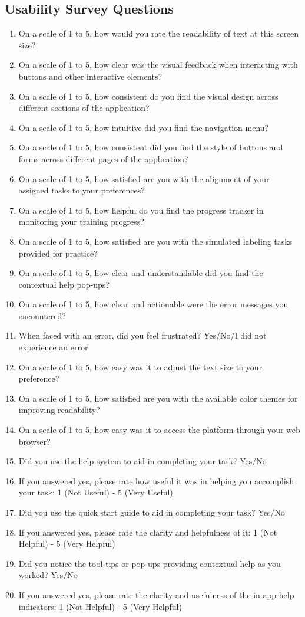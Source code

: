 \documentclass[12pt, titlepage]{article}
\begin{document}
\subsection{Usability Survey Questions}
\begin{enumerate}
    \item On a scale of 1 to 5, how would you rate the readability of text at this screen size? 
    \item On a scale of 1 to 5, how clear was the visual feedback when interacting with buttons and other interactive elements?
    \item On a scale of 1 to 5, how consistent do you find the visual design across different sections of the application?
    \item On a scale of 1 to 5, how intuitive did you find the navigation menu?
    \item On a scale of 1 to 5, how consistent did you find the style of buttons and forms across different pages of the application?
    \item On a scale of 1 to 5, how satisfied are you with the alignment of your assigned tasks to your preferences?
    \item On a scale of 1 to 5, how helpful do you find the progress tracker in monitoring your training progress?
    \item On a scale of 1 to 5, how satisfied are you with the simulated labeling tasks provided for practice?
    \item On a scale of 1 to 5, how clear and understandable did you find the contextual help pop-ups?
    \item On a scale of 1 to 5, how clear and actionable were the error messages you encountered?
    \item When faced with an error, did you feel frustrated? Yes/No/I did not experience an error
    \item On a scale of 1 to 5, how easy was it to adjust the text size to your preference?
    \item On a scale of 1 to 5, how satisfied are you with the available color themes for improving readability?
    \item On a scale of 1 to 5, how easy was it to access the platform through your web browser? 
    \item Did you use the help system to aid in completing your task? Yes/No
    \item If you answered yes, please rate how useful it was in helping you accomplish your task: 1 (Not Useful) - 5 (Very Useful)
    \item Did you use the quick start guide to aid in completing your task? Yes/No
    \item If you answered yes, please rate the clarity and helpfulness of it: 1 (Not Helpful) - 5 (Very Helpful)
    \item Did you notice the tool-tips or pop-ups providing contextual help as you worked? Yes/No
    \item If you answered yes, please rate the clarity and usefulness of the in-app help indicators: 1 (Not Helpful) - 5 (Very Helpful)
\end{enumerate}
\end{document}

